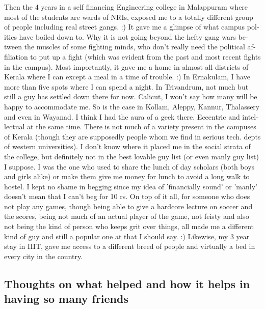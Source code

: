 \begin{english}
Then the 4 years in a self financing Engineering college in Malappuram where most of the students 
are wards of NRIs, exposed me to a totally different group of people including real street gangs. :) 
It gave me a glimpse of what campus politics have boiled down to. Why it is not going beyond the hefty 
gang wars between the muscles of some fighting minds, who don't really need the political affiliation 
to put up a fight (which was evident from the past and most recent fights in the campus). Most importantly, 
it gave me a home in almost all districts of Kerala where I can except a meal in a time of trouble. :) 
In Ernakulam, I have more than five spots where I can spend a night. In Trivandrum, not much but still 
a guy has settled down there for now. Calicut, I won't say how many will be happy to accommodate me. So is the case in Kollam, Aleppy, Kannur, Thalassery and even in Wayanad. I think I had the aura of a geek there.
Eccentric and intellectual at the same time. There is not much of a variety present in the campuses of Kerala
(though they are supposedly people whom we find in serious tech. depts of western universities). I
don't know where it placed me in the social strata of the college, but definitely not in the best lovable guy 
list (or even manly guy list) I suppose. I was the one who used to share the lunch of day
scholars (both boys and girls alike) or make them give me money for lunch to avoid a long walk to
hostel. I kept no shame in begging since my idea of 'financially sound' or 'manly' doesn't mean that I can't 
beg for 10 rs. On top of it all, for someone who does not play any games, though being able to give a hardcore lecture on soccer 
and the scores, being not much of an actual player of the game, not feisty and also not being the kind of person who keeps grit 
over things, all made me a different kind of guy and still a popular one at that I should say. :) Likewise, 
my 3 year stay in IIIT, gave me access to a different breed of people and virtually a bed in every 
city in the country.

\subsection*{Thoughts on what helped and how it helps in having so many friends}


\end{english}
